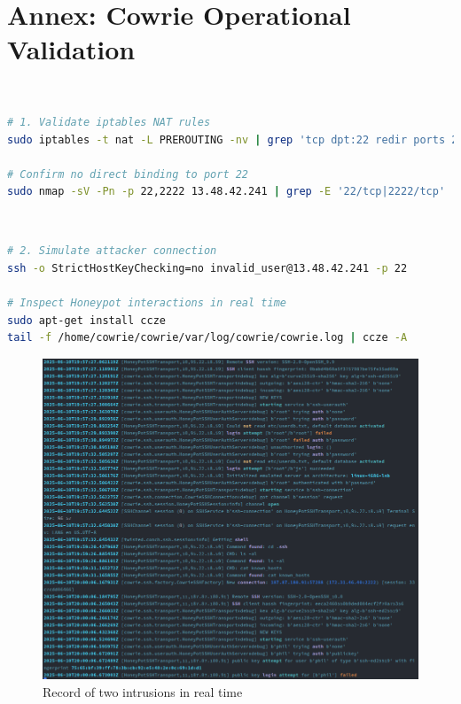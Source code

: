 \section{Annex: Cowrie Operational Validation}  
\label{annex:cowrie-validation}  
\
\
\begin{lstlisting}[language=bash,label={lst:cowrie-redirect},caption={Traffic Redirection Verification}]  
# 1. Validate iptables NAT rules  
sudo iptables -t nat -L PREROUTING -nv | grep 'tcp dpt:22 redir ports 2222'  

# Confirm no direct binding to port 22  
sudo nmap -sV -Pn -p 22,2222 13.48.42.241 | grep -E '22/tcp|2222/tcp'  
\end{lstlisting}  
\
\begin{lstlisting}[language=bash,label={lst:cowrie-access},caption={Honeypot Engagement Testing}]  
# 2. Simulate attacker connection  
ssh -o StrictHostKeyChecking=no invalid_user@13.48.42.241 -p 22  

# Inspect Honeypot interactions in real time  
sudo apt-get install ccze
tail -f /home/cowrie/cowrie/var/log/cowrie/cowrie.log | ccze -A  
\end{lstlisting}  
\begin{figure}[h!]
    \centering
    \includegraphics[width=1\linewidth]{doc/img/annex_c_listing_2.png}
    \caption*{Record of two intrusions in real time}
\end{figure}

\





